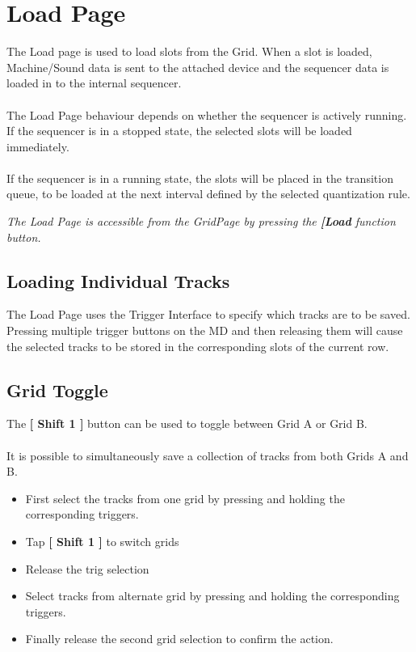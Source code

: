 \chapter{Load Page}
The Load page is used to load slots from the Grid. When a slot is loaded, Machine/Sound data is sent to the attached device and the sequencer data is loaded in to the internal sequencer.\\
\\
The Load Page behaviour depends on whether the sequencer is actively running.
If the sequencer is in a stopped state, the selected slots will be loaded immediately.\\\\
If the sequencer is in a running state, the slots will be placed in the transition queue, to be loaded at the next interval defined by the selected quantization rule.

\textit{The Load Page is accessible from the GridPage by pressing the  \textbf{[Load} function button.}

\section{Loading Individual Tracks}
The Load Page uses the Trigger Interface to specify which tracks are to be saved. Pressing multiple trigger buttons on the MD and then releasing them will cause the selected tracks to be stored in the corresponding slots of the current row.
\section{Grid Toggle}
The \textbf{[ Shift 1 ]} button can be used to toggle between Grid A or Grid B.\\\\
It is possible to simultaneously save a collection of tracks from both Grids A and B. 
\begin{itemize}
\item First select the tracks from one grid by pressing and holding the corresponding triggers.
\item Tap \textbf{[ Shift 1 ]} to switch grids
\item Release the trig selection
\item Select tracks from alternate grid by pressing and holding the corresponding triggers. 
\item Finally release the second grid selection to confirm the action. 
\end{itemize}

